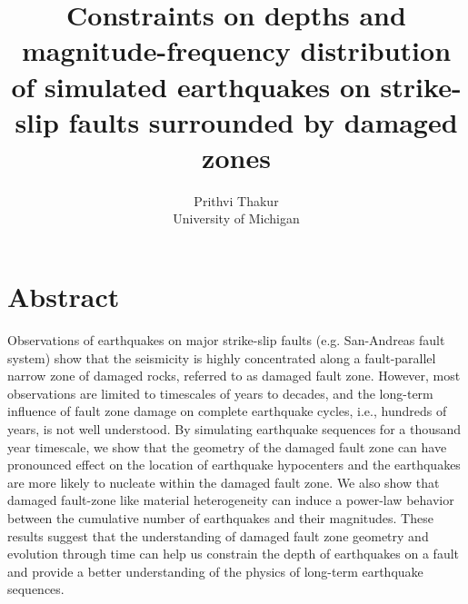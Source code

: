 \documentclass[11pt]{article}
\begin{document}
\title{\textbf{Constraints on depths and magnitude-frequency distribution of simulated earthquakes on strike-slip faults surrounded by damaged zones}}
\author{Prithvi Thakur\\University of Michigan}

\maketitle

\doublespacing
\section*{Abstract}
Observations of earthquakes on major strike-slip faults (e.g. San-Andreas fault system) show that the seismicity is highly concentrated along a fault-parallel narrow zone of damaged rocks, referred to as damaged fault zone. However, most observations are limited to timescales of years to decades, and the long-term influence of fault zone damage on complete earthquake cycles, i.e., hundreds of years, is not well understood. By simulating earthquake sequences for a thousand year timescale, we show that the geometry of the damaged fault zone can have pronounced effect on the location of earthquake hypocenters and the earthquakes are more likely to nucleate within the damaged fault zone. We also show that damaged fault-zone like material heterogeneity can induce a power-law behavior between the cumulative number of earthquakes and their magnitudes. These results suggest that the understanding of damaged fault zone geometry and evolution through time can help us constrain the depth of earthquakes on a fault and provide a better understanding of the physics of long-term earthquake sequences.
\end{document}
